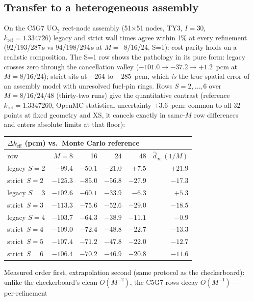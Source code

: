\documentclass[11pt,a4paper]{article}
\begin{document}
\subsection{Transfer to a heterogeneous assembly}
\label{sec:c5g7}
On the C5G7 UO$_2$ rect-node assembly (51$\times$51 nodes, TY3,
$I=30$, $k_\mathrm{ref}=1.334726$) legacy and strict wall times agree
within 1\% at every refinement (92/193/287\,s vs 94/198/294\,s at
$M=$~8/16/24, S{=}1): cost parity holds on a realistic composition.
The S{=}1 row shows the pathology in its pure form: legacy crosses
zero through the cancellation valley
($-101.0\to-37.2\to+1.2$~pcm at $M=8/16/24$); strict sits at $-264$
to $-285$~pcm, which \emph{is} the true spatial error of an assembly
model with unresolved fuel-pin rings.  Rows $S=2,\dots,6$ over
$M=8/16/24/48$ (thirty-two runs) give the quantitative contrast
(reference $k_\mathrm{ref}=1.3347260$, OpenMC statistical
uncertainty $\pm3.6$~pcm: common to all $32$ points at fixed geometry
and XS, it cancels exactly in same-$M$ row differences and enters
absolute limits at that floor):
\begin{center}
\begin{tabular}{lrrrrr}
\multicolumn{6}{l}{$\Delta k_\mathrm{eff}$ (pcm) vs.\ Monte Carlo reference}\\[2pt]
\toprule
row & $M{=}8$ & 16 & 24 & 48 & $\hat d_\infty\,(1/M)$ \\
\midrule
legacy $S{=}2$ & $-99.4$ & $-50.1$ & $-21.0$ & $+7.5$ & $+21.9$ \\
strict\ $S{=}2$ & $-125.3$ & $-85.0$ & $-56.8$ & $-27.9$ & $-17.3$ \\
legacy $S{=}3$ & $-102.6$ & $-60.1$ & $-33.9$ & $-6.3$ & $+5.3$ \\
strict\ $S{=}3$ & $-113.3$ & $-75.6$ & $-52.6$ & $-29.0$ & $-18.5$ \\
legacy $S{=}4$ & $-103.7$ & $-64.3$ & $-38.9$ & $-11.1$ & $-0.9$ \\
strict\ $S{=}4$ & $-109.0$ & $-72.4$ & $-48.8$ & $-22.7$ & $-13.3$ \\
strict\ $S{=}5$ & $-107.4$ & $-71.2$ & $-47.8$ & $-22.0$ & $-12.7$ \\
strict\ $S{=}6$ & $-106.4$ & $-70.2$ & $-46.9$ & $-20.8$ & $-11.6$ \\
\bottomrule
\end{tabular}
\end{center}
\noindent Measured order first, extrapolation second
(same protocol as the checkerboard): unlike the checkerboard's clean
$O(M^{-2})$, the C5G7 rows decay $O(M^{-1})$ --- per-refinement
\end{document}
